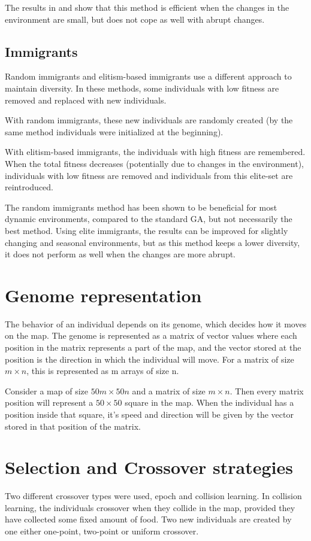 \documentclass[a4paper,12pt]{article}
\begin{document}
The results in \cite{cobb} and \cite{simoes} show that this method is efficient when the changes in the environment are small, but does not cope as well with abrupt changes.


\subsection{Immigrants}
Random immigrants and elitism-based immigrants use a different approach to maintain diversity. In these methods, some individuals with low fitness are removed and replaced with new individuals.

With random immigrants, these new individuals are randomly created (by the same method individuals were initialized at the beginning).

With elitism-based immigrants, the individuals with high fitness are remembered. When the total fitness decreases (potentially due to changes in the environment), individuals with low fitness are removed and individuals from this elite-set are reintroduced.

The random immigrants method has been shown to be beneficial for most dynamic environments, compared to the standard GA, but not necessarily the best method\cite{yang}. Using elite immigrants, the results can be improved for slightly changing and seasonal environments, but as this method keeps a lower diversity, it does not perform as well when the changes are more abrupt.

\section{Genome representation}
The behavior of an individual depends on its genome, which decides how it moves on the map. The genome is represented as a matrix of vector values where each position in the matrix represents a part of the map, and the vector stored at the position is the direction in which the individual will move. For a matrix of size $m \times n$, this is represented as m arrays of size n.

Consider a map of size $50m \times 50n$ and a matrix of size $m \times n$. Then every matrix position will represent a $50\times50$ square in the map. When the individual has a position inside that square, it's speed and direction will be given by the vector stored in that position of the matrix.

\section{Selection and Crossover strategies}
Two different crossover types were used, epoch and collision learning. In collision learning, the individuals crossover when they collide in the map, provided they have collected some fixed amount of food. Two new individuals are created by one either one-point, two-point or uniform crossover.
\end{document}
